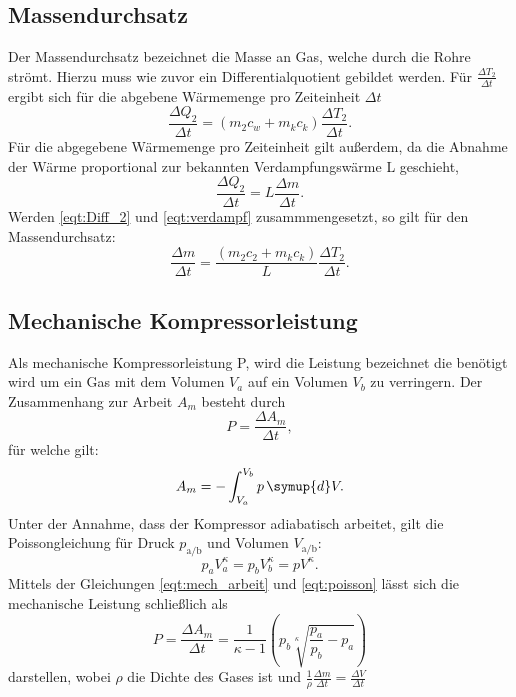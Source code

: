  \subsection{Massendurchsatz}
    Der Massendurchsatz bezeichnet die Masse an Gas, welche durch die Rohre strömt.
    Hierzu muss wie zuvor ein Differentialquotient gebildet werden. Für $\frac {\Delta T_2}{\Delta t}$ ergibt sich für die abgebene Wärmemenge pro Zeiteinheit $\Delta t$
    \begin{equation}
      \label{eqt:Diff_2}
      \frac {\Delta Q_2} {\Delta t} = (m_2 c_w + m_k c_k) \frac {\Delta T_2} {\Delta t}.
    \end{equation}
    Für die abgegebene Wärmemenge pro Zeiteinheit gilt außerdem, da die Abnahme der Wärme proportional zur bekannten Verdampfungswärme L geschieht, 
    \begin{equation}
      \label{eqt:verdampf}
      \frac {\Delta Q_2}{\Delta t} = L \frac {\Delta m} {\Delta t} .
    \end{equation}
    Werden \eqref {eqt:Diff_2} und \eqref {eqt:verdampf} zusammmengesetzt, so gilt für den Massendurchsatz:
    \begin{equation}
      \label{eqt:massendurchsatz}
      \frac {\Delta m} {\Delta t} = \frac {(m_2 c_2 + m_k c_k)}{L} \frac {\Delta T_2} {\Delta t} .
    \end{equation}

  \subsection{Mechanische Kompressorleistung}
    Als mechanische Kompressorleistung P, wird die Leistung bezeichnet die benötigt wird um ein Gas mit dem Volumen $V_a$ auf ein Volumen $V_b$ zu verringern.
    Der Zusammenhang zur Arbeit $A_m$ besteht durch
    \begin{equation}
      P = \frac {\Delta A_m} {\Delta t},
    \end{equation}
    für welche gilt:
    \begin{equation}
      \label{eqt:mech_arbeit}
      A_m = - \int_{V_a}^{V_b} p \, \symup{d}V .
    \end{equation}
    Unter der Annahme, dass der Kompressor adiabatisch arbeitet, gilt die Poissongleichung für Druck $p_\text{a/b}$ und Volumen $V_\text{a/b}$:
    \begin{equation}
      \label{eqt:poisson}
      p_a V_a^\kappa = p_b V_b^\kappa = p V^\kappa .
    \end{equation}
    Mittels der Gleichungen \eqref {eqt:mech_arbeit} und \eqref {eqt:poisson} lässt sich die mechanische Leistung schließlich als
    \begin{equation}
      \label{eqt:mech_leistung}
      P = \frac {\Delta A_m} {\Delta t} = \frac {1}{\kappa -1} (p_b \sqrt[\kappa]{\frac{p_a}{p_b} - p_a } )  
    \end{equation}  
    darstellen, wobei $\rho$ die Dichte des Gases ist und $\frac {1}{\rho} \frac {\Delta m} {\Delta t} = \frac {\Delta V}{\Delta t}$